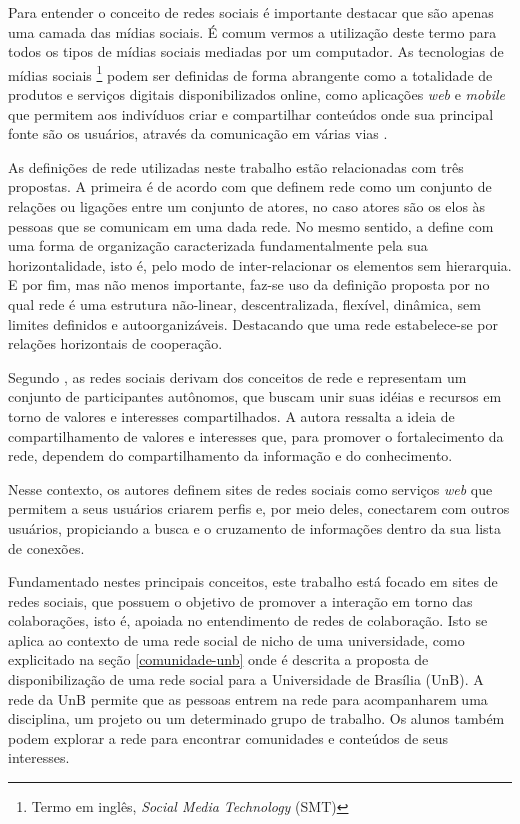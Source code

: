 Para entender o conceito de redes sociais é importante destacar que são apenas uma camada das mídias sociais. É comum vermos a utilização deste termo para todos os tipos de mídias sociais mediadas por um computador. As tecnologias de mídias sociais \footnote{Termo em inglês, \textit{Social Media Technology} (SMT)} podem ser definidas de forma abrangente como a totalidade de produtos e serviços digitais disponibilizados online, como aplicações \textit{web} e \textit{mobile} que permitem aos indivíduos criar e compartilhar conteúdos onde sua principal fonte são os usuários, através da comunicação em várias vias \cite{davis2012social}.

As definições de rede utilizadas neste trabalho estão relacionadas com três propostas. A primeira é de acordo com  que definem rede como um conjunto de relações ou ligações entre um conjunto de atores, no caso atores são os elos às pessoas que se comunicam em uma dada rede. No mesmo sentido,  a define com uma forma de organização caracterizada fundamentalmente pela sua horizontalidade, isto é, pelo modo de inter-relacionar os elementos sem hierarquia. E por fim, mas não menos importante, faz-se uso da definição proposta por  no qual rede é uma estrutura não-linear, descentralizada, flexível, dinâmica, sem limites definidos e autoorganizáveis. Destacando que uma rede estabelece-se por relações horizontais de cooperação.

Segundo \cite{marteleto2001analise}, as redes sociais derivam dos conceitos de rede e representam um conjunto de participantes autônomos, que buscam unir suas idéias e recursos em torno de valores e interesses compartilhados. A autora ressalta a ideia de compartilhamento de valores e interesses que, para promover o fortalecimento da rede, dependem do compartilhamento da informação e do conhecimento.

Nesse contexto, os autores  definem sites de redes sociais como serviços \textit{web} que permitem a seus usuários criarem perfis e, por meio deles, conectarem com outros usuários, propiciando a busca e o cruzamento de informações dentro da sua lista de conexões.

Fundamentado nestes principais conceitos, este trabalho está focado em sites de redes sociais, que possuem o objetivo de promover a interação em torno das colaborações, isto é, apoiada no entendimento de redes de colaboração. Isto se aplica ao contexto de uma rede social de nicho de uma universidade, como explicitado na seção \ref{comunidade-unb} onde é descrita a proposta de disponibilização de uma rede social para a Universidade de Brasília (UnB). A rede da UnB permite que as pessoas entrem na rede para acompanharem uma disciplina, um projeto ou um determinado grupo de trabalho. Os alunos também podem explorar a rede para encontrar comunidades e conteúdos de seus interesses.

